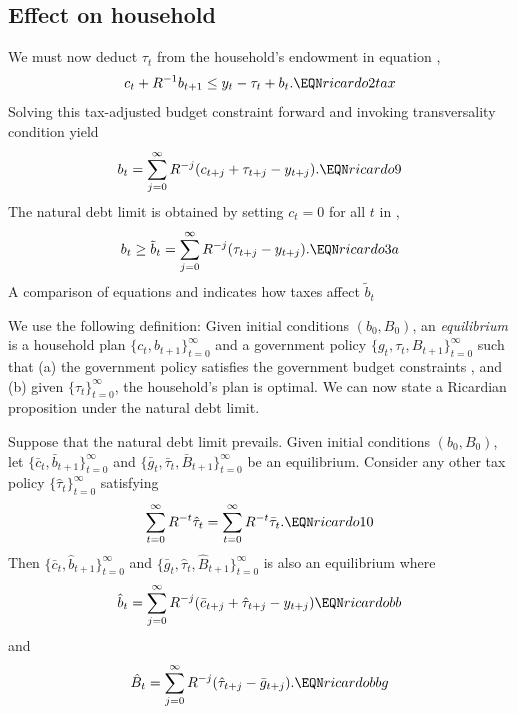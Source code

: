 \subsection{Effect on household}
We must now deduct $\tau_t$ from the household's endowment in equation
,
$$ c_t + R^{-1} b_{t+1} \leq y_t - \tau_t + b_t.  \EQN ricardo2tax$$
 Solving this tax-adjusted budget constraint forward
and invoking transversality condition  yield
$$ b_t = \sum_{j=0}^\infty R^{-j} (c_{t+j} + \tau_{t+j} - y_{t+j}).
 \EQN ricardo9$$
The natural debt limit is obtained by setting $c_t=0$ for all $t$
in ,
$$b_t \geq \tilde b_t = \sum_{j=0}^\infty R^{-j} (\tau_{t+j} - y_{t+j}).
    \EQN ricardo3a$$
A comparison of  equations  and  indicates how taxes affect
$\tilde b_t$



We use the following definition:
\medskip{} Given initial conditions $(b_0, B_0)$,
an {\it equilibrium} is
a household plan $\{c_t,   b_{t+1}\}_{t=0}^\infty$ and a government
policy $\{g_t, \tau_t, B_{t+1}\}_{t=0}^\infty$ such that (a) the government
policy satisfies the government budget    constraints , and
(b) given $\{\tau_t\}_{t=0}^\infty$, the household's  plan is optimal.
\medskip
  We can now state a Ricardian proposition
 under the natural debt limit.

\medskip{} Suppose that  the natural
debt limit prevails. Given initial conditions $(b_0, B_0)$,
let $\{\bar c_t, \bar b_{t+1}\}_{t=0}^\infty$ and
$\{\bar g_t, \bar \tau_t , \bar B_{t+1}\}_{t=0}^\infty$ be an equilibrium.
Consider any other tax policy $\{\hat \tau_t\}_{t=0}^\infty$ satisfying
$$ \sum_{t=0}^\infty R^{-t} \hat \tau_t =
\sum_{t=0}^\infty R^{-t} \bar \tau_t . \EQN ricardo10$$
Then  $\{\bar c_t, \hat b_{t+1}\}_{t=0}^\infty$ and $\{\bar g_t, \hat \tau_t,
\hat B_{t+1}\}_{t=0}^\infty$ is also an equilibrium where
$$ \hat b_t = \sum_{j=0}^\infty R^{-j} (\bar c_{t+j} +
\hat \tau_{t+j} - y_{t+j})                         \EQN ricardobb$$
and
$$ \hat B_t = \sum_{j=0}^\infty R^{-j}(\hat \tau_{t+j} -\bar g_{t+j}).
                                                    \EQN ricardobbg$$
\medskip

